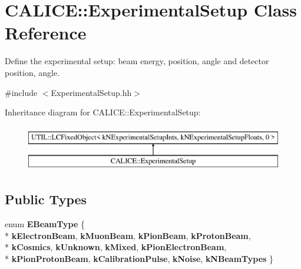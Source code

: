 \section{C\-A\-L\-I\-C\-E\-:\-:Experimental\-Setup Class Reference}
\label{classCALICE_1_1ExperimentalSetup}


Define the experimental setup\-: beam energy, position, angle and detector position, angle.  




{\ttfamily \#include $<$Experimental\-Setup.\-hh$>$}

Inheritance diagram for C\-A\-L\-I\-C\-E\-:\-:Experimental\-Setup\-:\begin{figure}[H]
\begin{center}
\leavevmode
\includegraphics[height=2.000000cm]{classCALICE_1_1ExperimentalSetup}
\end{center}
\end{figure}
\subsection*{Public Types}
\begin{DoxyCompactItemize}
\item 
enum {\bfseries E\-Beam\-Type} \{ \\*
{\bfseries k\-Electron\-Beam}, 
{\bfseries k\-Muon\-Beam}, 
{\bfseries k\-Pion\-Beam}, 
{\bfseries k\-Proton\-Beam}, 
\\*
{\bfseries k\-Cosmics}, 
{\bfseries k\-Unknown}, 
{\bfseries k\-Mixed}, 
{\bfseries k\-Pion\-Electron\-Beam}, 
\\*
{\bfseries k\-Pion\-Proton\-Beam}, 
{\bfseries k\-Calibration\-Pulse}, 
{\bfseries k\-Noise}, 
{\bfseries k\-N\-Beam\-Types}
 \}
\end{DoxyCompactItemize}
